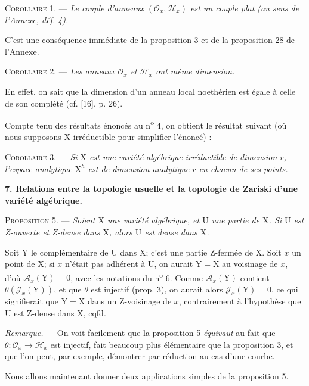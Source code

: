 \textsc{Corollaire} 1. — \textit{Le couple d'anneaux $(\mathcal{O}_x, \mathcal{H}_x)$ est un couple plat (au sens de l'Annexe, déf. 4).}

C'est une conséquence immédiate de la proposition 3 et de la proposition 28 de l'Annexe.

\textsc{Corollaire} 2. — \textit{Les anneaux $\mathcal{O}_x$ et $\mathcal{H}_x$ ont même dimension.}

En effet, on sait que la dimension d'un anneau local noethérien est égale à celle de son complété (cf. [16], p. 26).

Compte tenu des résultats énoncés au n\textsuperscript{o} 4, on obtient le résultat suivant (où nous supposons $\mathrm{X}$ irréductible pour simplifier l'énoncé) :

\textsc{Corollaire} 3. — \textit{Si $\mathrm{X}$ est une variété algébrique irréductible de dimension $r$, l'espace analytique $\mathrm{X}^h$ est de dimension analytique $r$ en chacun de ses points.}


\textbf{7. Relations entre la topologie usuelle et la topologie de Zariski d'une variété algébrique.}

\textsc{Proposition} 5. — \textit{Soient $\mathrm{X}$ une variété algébrique, et $\mathrm{U}$ une partie de $\mathrm{X}$. Si $\mathrm{U}$ est Z-ouverte et Z-dense dans $\mathrm{X}$, alors $\mathrm{U}$ est dense dans $\mathrm{X}$.}

Soit $\mathrm{Y}$ le complémentaire de $\mathrm{U}$ dans $\mathrm{X}$; c'est une partie Z-fermée de $\mathrm{X}$. Soit $x$ un point de $\mathrm{X}$; si $x$ n'était pas adhérent à $\mathrm{U}$, on aurait $\mathrm{Y} = \mathrm{X}$ au voisinage de $x$, d'où $\mathcal{A}_x(\mathrm{Y}) = 0$, avec les notations du n\textsuperscript{o} 6. Comme $\mathcal{A}_x(\mathrm{Y})$ contient $\theta(\mathcal{J}_x(\mathrm{Y}))$, et que $\theta$ est injectif (prop. 3), on aurait alors $\mathcal{J}_x(\mathrm{Y}) = 0$, ce qui signifierait que $\mathrm{Y} = \mathrm{X}$ dans un Z-voisinage de $x$, contrairement à l'hypothèse que $\mathrm{U}$ est Z-dense dans $\mathrm{X}$, cqfd.

\textit{Remarque.} — On voit facilement que la proposition 5 \textit{équivaut} au fait que $\theta : \mathcal{O}_x \to \mathcal{H}_x$ est injectif, fait beaucoup plus élémentaire que la proposition 3, et que l'on peut, par exemple, démontrer par réduction au cas d'une courbe.

Nous allons maintenant donner deux applications simples de la proposition 5.


